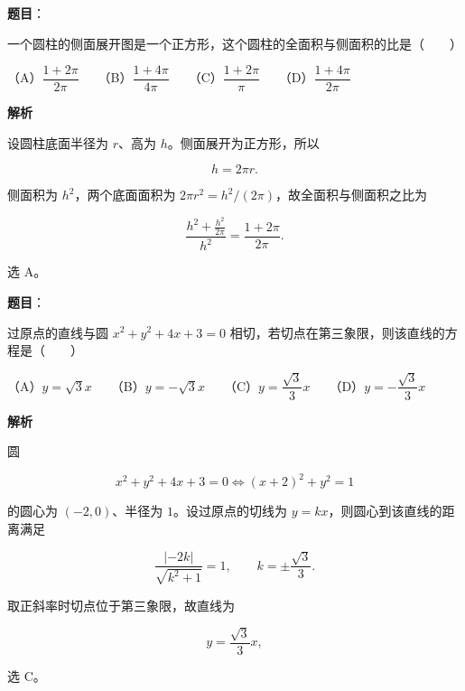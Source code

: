 \begin{answer}

\textbf{题目}：

一个圆柱的侧面展开图是一个正方形，这个圆柱的全面积与侧面积的比是\mbox{（　　）}

（A）$\dfrac{1+2\pi}{2\pi}$　　（B）$\dfrac{1+4\pi}{4\pi}$　　（C）$\dfrac{1+2\pi}{\pi}$　　（D）$\dfrac{1+4\pi}{2\pi}$

\textbf{解析}

设圆柱底面半径为 $r$、高为 $h$。侧面展开为正方形，所以

\nopagebreak[4]
\[
h=2\pi r.
\]

侧面积为 $h^2$，两个底面面积为 $2\pi r^2=h^2/(2\pi)$，故全面积与侧面积之比为

\nopagebreak[4]
\[
\frac{h^2+\frac{h^2}{2\pi}}{h^2}
=\frac{1+2\pi}{2\pi}.
\]

选 A。


\end{answer}
\begin{answer}

\textbf{题目}：

过原点的直线与圆 $x^2+y^2+4x+3=0$ 相切，若切点在第三象限，则该直线的方程是\mbox{（　　）}

（A）$y=\sqrt3x$　　（B）$y=-\sqrt3x$　　（C）$y=\dfrac{\sqrt3}{3}x$　　（D）$y=-\dfrac{\sqrt3}{3}x$

\textbf{解析}

圆

\nopagebreak[4]
\[
x^2+y^2+4x+3=0
\Longleftrightarrow
(x+2)^2+y^2=1
\]

的圆心为 $(-2,0)$、半径为 $1$。设过原点的切线为 $y=kx$，则圆心到该直线的距离满足

\nopagebreak[4]
\[
\frac{|{-2k}|}{\sqrt{k^2+1}}=1,
\qquad k=\pm\frac{\sqrt3}{3}.
\]

取正斜率时切点位于第三象限，故直线为

\nopagebreak[4]
\[
y=\frac{\sqrt3}{3}x,
\]

选 C。


\end{answer}
